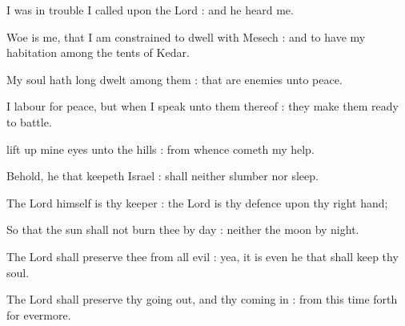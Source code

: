 

 I was in trouble I called upon the Lord : and he heard me.\par
{}
Woe is me, that I am constrained to dwell with Mesech : and to have my habitation among the tents of Kedar.\par
{}My soul hath long dwelt among them : that are enemies unto peace.\par
{}I labour for peace, but when I speak unto them thereof : they make them ready to battle.\par


 lift up mine eyes unto the hills : from whence cometh my help.\par
{}
Behold, he that keepeth Israel : shall neither slumber nor sleep.\par
{}The Lord himself is thy keeper : the Lord is thy defence upon thy right hand;\par
{}So that the sun shall not burn thee by day : neither the moon by night.\par
{}The Lord shall preserve thee from all evil : yea, it is even he that shall keep thy soul.\par
{}The Lord shall preserve thy going out, and thy coming in : from this time forth for evermore.\par


